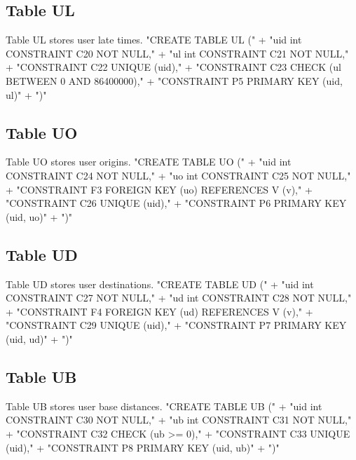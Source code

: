 \subsection{Table UL}
Table UL stores user late times.
\nwenddocs{}\endmoddef{}
"CREATE TABLE UL ("
  + "uid int  CONSTRAINT C20 NOT NULL,"
  + "ul  int  CONSTRAINT C21 NOT NULL,"
  + "CONSTRAINT C22 UNIQUE (uid),"
  + "CONSTRAINT C23 CHECK (ul BETWEEN 0 AND 86400000),"
  + "CONSTRAINT P5 PRIMARY KEY (uid, ul)"
  + ")"
\nwendcode{}\nwdocspar

\subsection{Table UO}
Table UO stores user origins.
\nwenddocs{}\endmoddef{}
"CREATE TABLE UO ("
  + "uid int  CONSTRAINT C24 NOT NULL,"
  + "uo  int  CONSTRAINT C25 NOT NULL,"
  + "CONSTRAINT F3 FOREIGN KEY (uo) REFERENCES V (v),"
  + "CONSTRAINT C26 UNIQUE (uid),"
  + "CONSTRAINT P6 PRIMARY KEY (uid, uo)"
  + ")"
\nwendcode{}\nwdocspar

\subsection{Table UD}
Table UD stores user destinations.
\nwenddocs{}\endmoddef{}
"CREATE TABLE UD ("
  + "uid int  CONSTRAINT C27 NOT NULL,"
  + "ud  int  CONSTRAINT C28 NOT NULL,"
  + "CONSTRAINT F4 FOREIGN KEY (ud) REFERENCES V (v),"
  + "CONSTRAINT C29 UNIQUE (uid),"
  + "CONSTRAINT P7 PRIMARY KEY (uid, ud)"
  + ")"
\nwendcode{}\nwdocspar

\subsection{Table UB}
Table UB stores user base distances.
\nwenddocs{}\endmoddef{}
"CREATE TABLE UB ("
  + "uid int  CONSTRAINT C30 NOT NULL,"
  + "ub  int  CONSTRAINT C31 NOT NULL,"
  + "CONSTRAINT C32 CHECK (ub >= 0),"
  + "CONSTRAINT C33 UNIQUE (uid),"
  + "CONSTRAINT P8 PRIMARY KEY (uid, ub)"
  + ")"
\nwendcode{}\nwdocspar

